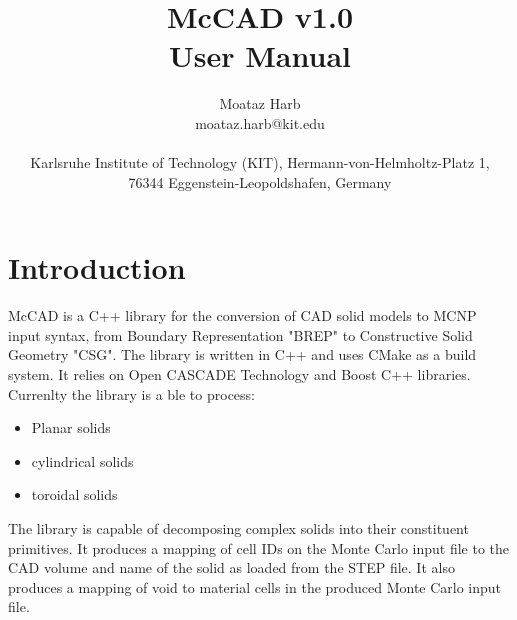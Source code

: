 \documentclass[letterpaper, 12 pt]{report}
\begin{document}
\title{McCAD v1.0 \\ User Manual}
\author{Moataz Harb \\ moataz.harb@kit.edu \\ \\ Karlsruhe Institute of Technology (KIT), Hermann-von-Helmholtz-Platz 1, \\ 76344 Eggenstein-Leopoldshafen, Germany}
\maketitle
\pagestyle{empty}

\tableofcontents
\newpage

\section{Introduction} \label{sec:Introduction}
McCAD is a C++ library for the conversion of CAD solid models to MCNP input syntax, from Boundary Representation "BREP" to Constructive Solid Geometry "CSG". The library is written in C++ and uses CMake as a build system. It relies on Open CASCADE Technology and Boost C++ libraries. Currenlty the library is a ble to process:
\begin{itemize}
	\item Planar solids
	\item cylindrical solids
	\item toroidal solids
\end{itemize}

The library is capable of decomposing complex solids into their constituent primitives. It produces a mapping of cell IDs on the Monte Carlo input file to the CAD volume and name of the solid as loaded from the STEP file. It also produces a mapping of void to material cells in the produced Monte Carlo input file.
\end{document}
